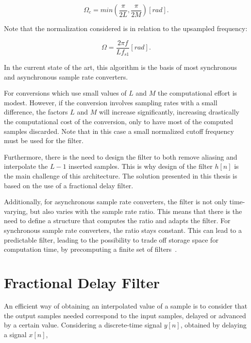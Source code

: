 \begin{equation}
  \Omega_c = min(\frac{\pi}{2L}, \frac{\pi}{2M}) [rad] .
  \label{eq:filter_cutoff}
\end{equation}

Note that the normalization considered is in relation to the upsampled frequency:

\begin{equation}
  \Omega = \frac{2\pi f}{Lf_{s1}} [rad].
  \label{eq:freq_norm}
\end{equation}

In the current state of the art, this algorithm is the basis of most synchronous
and asynchronous sample rate converters.

For conversions which use small values of $L$ and $M$ the computational effort is
modest. However, if the conversion involves sampling rates with a small
difference, the factors $L$ and $M$ will increase significantly, increasing
drastically the computational cost of the conversion, only to have most of the
computed samples discarded. Note that in this case a small normalized cutoff
frequency must be used for the filter.

Furthermore, there is the need to design the filter to both remove aliasing and
interpolate the $L-1$ inserted samples. This is why design of the filter $h[n]$
is the main challenge of this architecture. The solution presented in this
thesis is based on the use of a fractional delay filter.

Additionally, for asynchronous sample rate converters, the filter is not
only time-varying, but also varies with the sample rate ratio. This means
that there is the need to define a structure that computes the ratio
and adapts the filter. For synchronous sample rate converters, the ratio
stays constant. This can lead to a predictable filter, leading to the
possibility to trade off storage space for computation time, by
precomputing a finite set of filters~\cite{ad:asrc}.

\section{Fractional Delay Filter}
\label{section:fd_filter}

An efficient way of obtaining an interpolated value of a sample is to consider
that the output samples needed correspond to the input samples, delayed or
advanced by a certain value. Considering a discrete-time signal $y[n]$, obtained
by delaying a signal $x[n]$,

